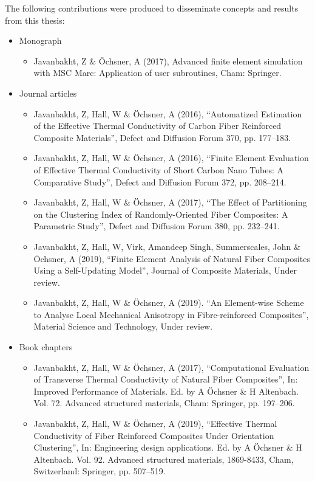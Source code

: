 
	The following contributions were produced to disseminate concepts and results from this thesis:
	\begin{itemize}
		\item Monograph
		\begin{itemize}
			\item Javanbakht, Z \& Öchsner, A (2017), Advanced finite element simulation with MSC Marc: Application of user subroutines, Cham: Springer.
		\end{itemize}
		\item Journal articles
	\begin{itemize}
		\item Javanbakht, Z, Hall, W \& Öchsner, A (2016), “Automatized Estimation of the Effective Thermal Conductivity of Carbon Fiber Reinforced Composite Materials”, Defect and Diffusion Forum 370, pp. 177–183.
		\item Javanbakht, Z, Hall, W \& Öchsner, A (2016), “Finite Element Evaluation of Effective Thermal Conductivity of Short Carbon Nano Tubes: A Comparative Study”, Defect and Diffusion Forum 372, pp. 208–214.
		\item Javanbakht, Z, Hall, W \& Öchsner, A (2017), “The Effect of Partitioning on the Clustering Index of Randomly-Oriented Fiber Composites: A Parametric Study”, Defect and Diffusion Forum 380, pp. 232–241.
		\item Javanbakht, Z, Hall, W, Virk, Amandeep Singh, Summerscales, John \& Öchsner, A (2019), ``Finite Element Analysis of Natural Fiber Composites Using a Self-Updating Model'', Journal of Composite Materials, Under review.
		\item Javanbakht, Z, Hall, W \& Öchsner, A (2019). “An Element-wise Scheme to Analyse Local Mechanical Anisotropy in Fibre-reinforced Composites”, Material Science and Technology, Under review.
	\end{itemize}
	\item Book chapters
	\begin{itemize}
		\item Javanbakht, Z, Hall, W \& Öchsner, A (2017), “Computational Evaluation of Transverse Thermal Conductivity of Natural Fiber Composites”, In: Improved Performance of Materials. Ed. by A Öchsner \& H Altenbach. Vol. 72. Advanced structured materials, Cham: Springer, pp. 197–206.
		\item Javanbakht, Z, Hall, W \& Öchsner, A (2019), “Effective Thermal Conductivity of Fiber Reinforced Composites Under Orientation Clustering”, In: Engineering design applications. Ed. by A Öchsner \& H Altenbach. Vol. 92. Advanced structured materials, 1869-8433, Cham, Switzerland: Springer, pp. 507–519.
	\end{itemize}
	\end{itemize}